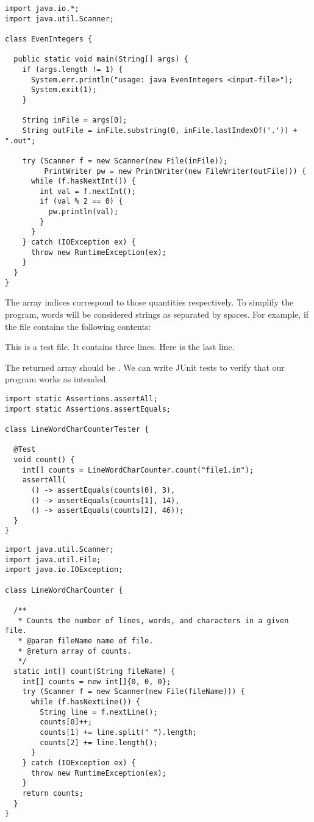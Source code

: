 \enlargethispage{-1\baselineskip}
\begin{lstlisting}[language=MyJava]
import java.io.*;
import java.util.Scanner;

class EvenIntegers {

  public static void main(String[] args) {
    if (args.length != 1) {
      System.err.println("usage: java EvenIntegers <input-file>");
      System.exit(1);
    }

    String inFile = args[0];
    String outFile = inFile.substring(0, inFile.lastIndexOf('.')) + ".out";

    try (Scanner f = new Scanner(new File(inFile));
         PrintWriter pw = new PrintWriter(new FileWriter(outFile))) {
      while (f.hasNextInt()) {
        int val = f.nextInt();
        if (val % 2 == 0) { 
          pw.println(val); 
        }
      }
    } catch (IOException ex) { 
      throw new RuntimeException(ex); 
    }
  }
}
\end{lstlisting}

The array indices correspond to those quantities respectively. 
To simplify the program, words will be considered strings as separated by spaces. 
For example, if the file contains the following contents:

\begin{verbnobox}[\small]
This is a test file.
It contains three lines.
Here is the last line.
\end{verbnobox}

The returned array should be \ttt{[3, 14, 46]}. 
We can write JUnit tests to verify that our program works as intended.

\begin{lstlisting}[language=MyJava]
import static Assertions.assertAll;
import static Assertions.assertEquals;

class LineWordCharCounterTester {

  @Test
  void count() {
    int[] counts = LineWordCharCounter.count("file1.in");
    assertAll(
      () -> assertEquals(counts[0], 3),
      () -> assertEquals(counts[1], 14),
      () -> assertEquals(counts[2], 46));
  }
}
\end{lstlisting}

\begin{lstlisting}[language=MyJava]
import java.util.Scanner;
import java.util.File;
import java.io.IOException;

class LineWordCharCounter {

  /**
   * Counts the number of lines, words, and characters in a given file.
   * @param fileName name of file.
   * @return array of counts.
   */
  static int[] count(String fileName) {
    int[] counts = new int[]{0, 0, 0};
    try (Scanner f = new Scanner(new File(fileName))) {
      while (f.hasNextLine()) {
        String line = f.nextLine();
        counts[0]++;
        counts[1] += line.split(" ").length;
        counts[2] += line.length();
      }
    } catch (IOException ex) { 
      throw new RuntimeException(ex); 
    }
    return counts;
  }
}
\end{lstlisting}


